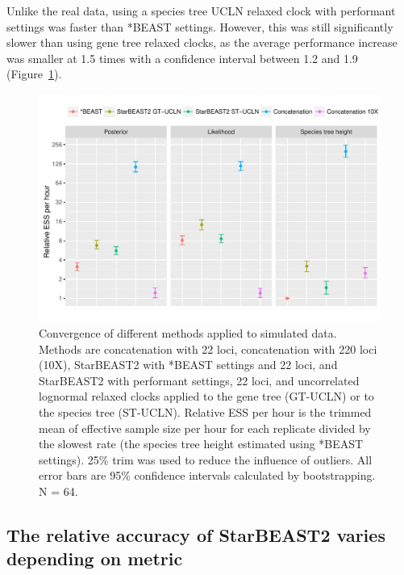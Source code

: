 \documentclass[12pt]{article}
\begin{document}
Unlike the real data, using a species tree UCLN relaxed clock with performant
settings was faster than *BEAST settings. However, this was still significantly
slower than using gene tree relaxed clocks, as the average performance increase
was smaller at 1.5 times with a confidence interval between 1.2 and 1.9
(Figure~\ref{fig:simulatedEssPerHour}).

\begin{figure}[htb!]
\centering
\includegraphics[width=16cm]{multiple_ess_per_hour.pdf}
\caption
{Convergence of different methods applied to simulated data. Methods are
concatenation with 22 loci, concatenation with 220 loci (10X), StarBEAST2 with
*BEAST settings and 22 loci, and StarBEAST2 with performant settings, 22 loci,
and uncorrelated lognormal relaxed clocks applied to the gene tree (GT-UCLN) or
to the species tree (ST-UCLN). Relative ESS per hour is the trimmed mean of
effective sample size per hour for each replicate divided by the slowest rate
(the species tree height estimated using *BEAST
settings). 25\% trim was used to reduce the influence of
outliers. All error bars are 95\% confidence intervals calculated by
bootstrapping. N = 64.}
\label{fig:simulatedEssPerHour}
\end{figure}

\subsection{The relative accuracy of StarBEAST2 varies depending on metric}
\end{document}
